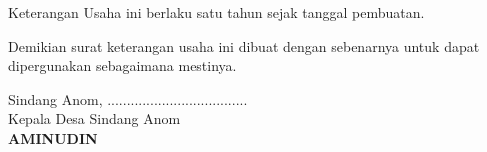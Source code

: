\documentclass[a4paper, 12pt]{article}
\begin{document}
Keterangan Usaha ini berlaku satu tahun sejak tanggal pembuatan.
\vspace{0.2cm}

Demikian surat keterangan usaha ini dibuat dengan sebenarnya untuk dapat dipergunakan sebagaimana mestinya.
\vspace{1.5cm}

\begin{flushright}
    Sindang Anom, .................................... \\
    Kepala Desa Sindang Anom \\
    \vspace{2.5cm} %
    \textbf{AMINUDIN} \\
\end{flushright}
\end{document}
